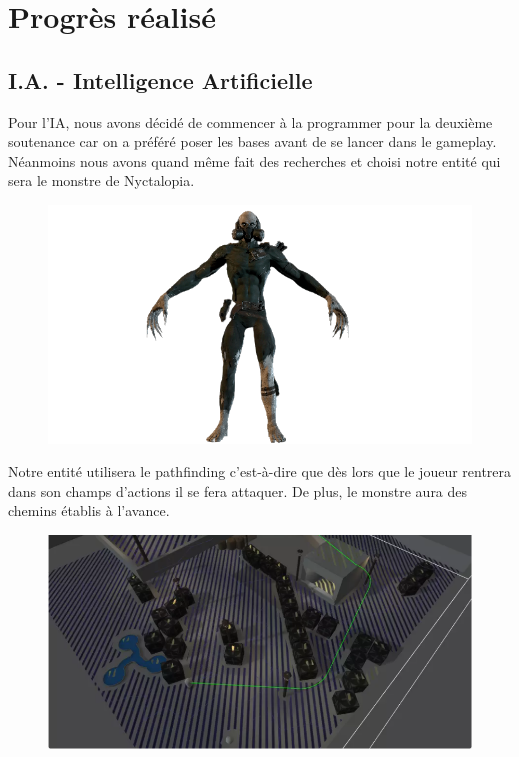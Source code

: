 \section{Progrès réalisé}

\subsection{I.A. - Intelligence Artificielle}
\setlength{\parindent}{5ex}
Pour l'IA, nous avons décidé de commencer à la programmer pour la deuxième soutenance car on a préféré poser les bases avant de se lancer dans le gameplay. Néanmoins nous avons quand même fait des recherches et choisi notre entité qui sera le monstre de Nyctalopia.

\begin{figure}[H]
\centering
\begin{minipage}{.5\textwidth}
  \centering
  \centerline{\includegraphics[width=1\linewidth]{img/assets/sterven.png}}
  \label{fig:méchant}
\end{minipage}%
\end{figure}

Notre entité utilisera le pathfinding c’est-à-dire que dès lors que le joueur rentrera dans son champs d'actions il se fera attaquer. De plus, le monstre aura des chemins établis à l'avance.

\begin{figure}[H]
\centering
\begin{minipage}{.5\textwidth}
  \centering
  \centerline{\includegraphics[width=1\linewidth]{img/path.png}}
  \label{fig:pathfinding}
\end{minipage}%
\end{figure}



